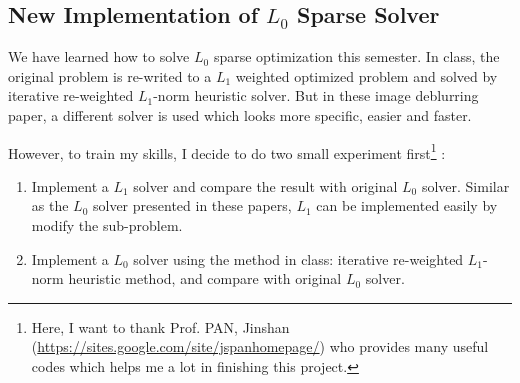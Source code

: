 \documentclass[journal, onecolumn, 10pt]{IEEEtran}
\begin{document}
\subsection{New Implementation of $L_0$ Sparse Solver}
We have learned how to solve $L_0$ sparse optimization this semester. In class, the original problem is re-writed to a $L_1$ weighted optimized problem and solved by iterative re-weighted $L_1$-norm heuristic solver. But in these image deblurring paper, a different solver is used which looks more specific, easier and faster.

However, to train my skills, I decide to do two small experiment first\footnote{Here, I want to thank Prof. PAN, Jinshan (\url{https://sites.google.com/site/jspanhomepage/}) who provides many useful codes which helps me a lot in finishing this project. } :
\begin{enumerate}
\item Implement a $L_1$ solver and compare the result with original $L_0$ solver. Similar as the $L_0$ solver presented in these papers\cite{xu2013unnatural}\cite{pan2014deblurring}, $L_1$ can be implemented easily by modify the sub-problem.
\item Implement a $L_0$ solver using the method in class: iterative re-weighted $L_1$-norm heuristic method, and compare with original $L_0$ solver. 
\end{enumerate}


\newpage




\end{document}
